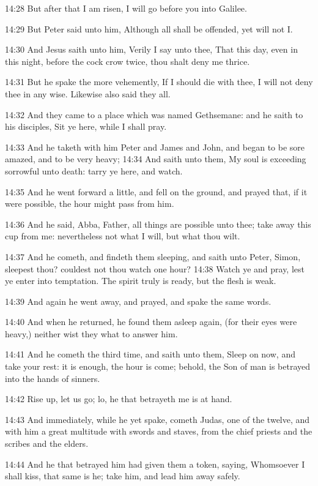 14:28 But after that I am risen, I will go before you into Galilee.

14:29 But Peter said unto him, Although all shall be offended, yet will not I.

14:30 And Jesus saith unto him, Verily I say unto thee, That this day, even in this night, before the cock crow twice, thou shalt deny me thrice.

14:31 But he spake the more vehemently, If I should die with thee, I will not deny thee in any wise. Likewise also said they all.

14:32 And they came to a place which was named Gethsemane: and he saith to his disciples, Sit ye here, while I shall pray.

14:33 And he taketh with him Peter and James and John, and began to be sore amazed, and to be very heavy; 14:34 And saith unto them, My soul is exceeding sorrowful unto death: tarry ye here, and watch.

14:35 And he went forward a little, and fell on the ground, and prayed that, if it were possible, the hour might pass from him.

14:36 And he said, Abba, Father, all things are possible unto thee; take away this cup from me: nevertheless not what I will, but what thou wilt.

14:37 And he cometh, and findeth them sleeping, and saith unto Peter, Simon, sleepest thou? couldest not thou watch one hour?  14:38 Watch ye and pray, lest ye enter into temptation. The spirit truly is ready, but the flesh is weak.

14:39 And again he went away, and prayed, and spake the same words.

14:40 And when he returned, he found them asleep again, (for their eyes were heavy,) neither wist they what to answer him.

14:41 And he cometh the third time, and saith unto them, Sleep on now, and take your rest: it is enough, the hour is come; behold, the Son of man is betrayed into the hands of sinners.

14:42 Rise up, let us go; lo, he that betrayeth me is at hand.

14:43 And immediately, while he yet spake, cometh Judas, one of the twelve, and with him a great multitude with swords and staves, from the chief priests and the scribes and the elders.

14:44 And he that betrayed him had given them a token, saying, Whomsoever I shall kiss, that same is he; take him, and lead him away safely.

